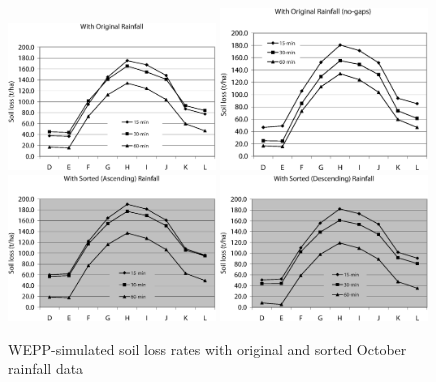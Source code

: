 \begin{figure}[htbp]
  \centering
    \includegraphics[width=0.49\textwidth]{./img/wepp_soilloss_with_original}
    \includegraphics[width=0.49\textwidth]
{./img/wepp_soilloss_with_original_nogap}\\[5mm]
    \includegraphics[width=0.49\textwidth]{./img/wepp_soilloss_with_sorted_asc}
    \includegraphics[width=0.49\textwidth]{./img/wepp_soilloss_with_sorted_des}
  \caption{WEPP-simulated soil loss rates with original and sorted October
rainfall data}
  \label{fig:wepp_soilloss_results}
\end{figure}


